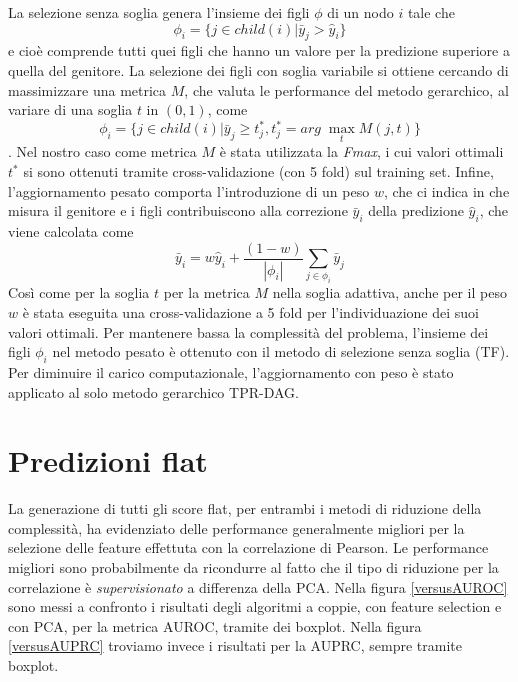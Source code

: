 \documentclass[12pt]{report}
\begin{document}
La selezione senza soglia genera l'insieme dei figli $\phi$ di un nodo $i$ tale che
\[
\phi_i = \{j \in child(i) | \bar{y}_j > \hat{y}_i \}
\]
e cioè comprende tutti quei figli che hanno un valore per la predizione superiore a quella del genitore.
\newline
\newline
La selezione dei figli con soglia variabile  si ottiene cercando di massimizzare una metrica $M$, che valuta le performance del metodo gerarchico, al variare di una soglia $t$ in $(0,1)$, come 
\[
\phi_i = \{j \in child(i) | \bar{y}_j \geq t_j^{*}, t_j^{*} = arg\;\max_{t} M(j, t)   \}
\]
. Nel nostro caso come metrica $M$ è stata utilizzata la \emph{Fmax}, i cui valori ottimali $t^{*}$  si sono ottenuti tramite cross-validazione (con 5 fold) sul training set.
\newline
\newline
Infine, l'aggiornamento pesato comporta l'introduzione di un peso $w$, che ci indica in che misura il genitore e i figli contribuiscono alla correzione $\bar{y}_i$ della predizione $\hat{y}_i$, che viene calcolata come
\[
\bar{y}_i = w \hat{y}_i + \frac{(1-w)}{|\phi_i|}\sum_{j \in \phi_i}\bar{y}_j
\]
Così come per la soglia $t$ per la metrica $M$ nella soglia adattiva, anche per il peso $w$ è stata eseguita una cross-validazione a 5 fold per l'individuazione dei suoi valori ottimali. Per mantenere bassa la complessità del problema, l'insieme dei figli $\phi_i$ nel metodo pesato è ottenuto con il metodo di selezione senza soglia (TF). Per diminuire il carico computazionale, l'aggiornamento con peso è stato applicato al solo metodo gerarchico TPR-DAG.

\section{Predizioni flat}
La generazione di tutti gli score flat, per entrambi i metodi di riduzione della complessità, ha evidenziato delle performance generalmente migliori per la selezione delle feature effettuta con la correlazione di Pearson. Le performance migliori sono probabilmente da ricondurre al fatto che il tipo di riduzione per la correlazione è \emph{supervisionato} a differenza della PCA.
\newline
\newline
Nella figura \ref{versusAUROC} sono messi a confronto i risultati degli algoritmi a coppie, con feature selection e con PCA, per la metrica AUROC, tramite dei boxplot. Nella figura \ref{versusAUPRC} troviamo invece i risultati per la AUPRC, sempre tramite boxplot.
\end{document}
